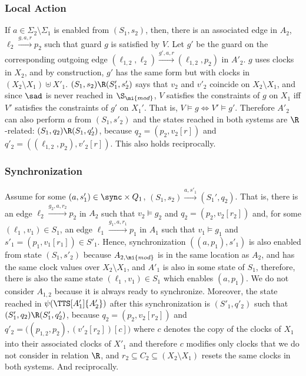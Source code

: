 \documentclass{LMCS}
\theoremstyle{plain}\newtheorem*{prop11}{Proposition~\ref{prop:states} bis}
\begin{document}
  \subsubsection*{Local Action}
  If $a\in\Sigma_2\setminus\Sigma_1$ is enabled from $(S_1,s_2)$, then,
  there is an associated edge in $A_2$, $\ell_2\xrightarrow{g,a,r}p_2$ such that
  guard $g$ is satisfied by $V$.
  Let $g'$ be the guard on the corresponding outgoing edge
  $(\ell_{1,2},\ell_2)\xrightarrow{g',a,r}(\ell_{1,2},p_2)$ in $A'_2$.
  $g$ uses clocks in $X_2$, and by construction,
  $g'$ has the same form but with clocks in $(X_2\setminus X_1)\uplus X'_1$.
  $(S_1,s_2)\R(S'_1,s'_2)$ says that $v_2$ and $v'_2$ coincide on $X_2\setminus X_1$, and since
  $\sad$ is never reached in $\S_\mi{mod}$, $V$ satisfies the constraints of $g$
  on $X_1$ iff $V'$ satisfies the constraints of $g'$ on $X_1'$.
  That is, $V\models g\iff V'\models g'$. Therefore $A'_2$ can also perform
  $a$ from $(S_1,s'_2)$ and the states reached in both systems
  are $\R$-related: $(S_1,q_2)\R(S_1,q'_2)$, because $q_2=(p_2,v_2[r])$ and
  $q'_2=((\ell_{1,2},p_2),v'_2[r])$.
  This also holds reciprocally.

  \subsubsection*{Synchronization} Assume for some $(a,s'_1)\in\sync\times Q_1$,
  $(S_1,s_2)\xrightarrow{a,s'_1}(S_1',q_2)$.
  That is, there is an edge
  $\ell_2\xrightarrow{g_2,a,r_2} p_2$  in $A_2$ such that $v_2\models g_2$
  and $q_2=(p_2,v_2[r_2])$ and,
  for some $(\ell_1,v_1)\in S_1$, an edge $\ell_1\xrightarrow{g_1,a,r_1} p_1$
  in $A_1$ such that $v_1\models g_1$ and $s'_1=(p_1,v_1[r_1])\in S'_1$.
  Hence, synchronization $((a,p_1),s'_1)$ is also enabled from state $(S_1,s'_2)$
  because $A_{2,\mi{mod}}$ is in the same location as $A_2$, and has the same
  clock values over $X_2\setminus X_1$, and $A'_1$ is also in some state
  of $S_1$, therefore, there is also the same state $(\ell_1,v_1)\in S_1$
  which enables $(a,p_1)$.
  We do not consider $A_{1,2}$ because it is always ready to
  synchronize.
Moreover, the state reached in $\psi(\TTS[A'_1]{A'_2})$ after this synchronization is
  $(S'_1,q'_2)$ such that $(S'_1,q_2)\R(S'_1,q'_2)$, because $q_2=(p_2,v_2[r_2])$
  and $q'_2=\big((p_{1,2},p_2),(v'_2[r_2])[c]\big)$ where $c$ denotes the copy of the
  clocks of $X_1$ into their associated clocks of $X'_1$ and therefore $c$ modifies
  only clocks that we do not consider in relation $\R$, and $r_2\subseteq C_2\subseteq(X_2\setminus X_1)$
  resets the same clocks in both systems.
And reciprocally.
\end{document}
